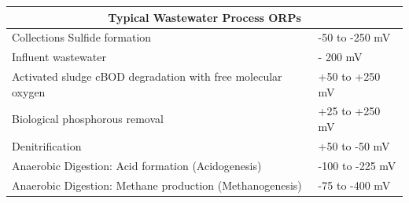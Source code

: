 			
			\setlength{\arrayrulewidth}{0.3mm}
			\setlength{\tabcolsep}{8 pt}
			\renewcommand{\arraystretch}{1.3}
			\begin{center}
				\begin{tabular}{ |p{9.5cm}|p{4.0cm}|}
					\hline
					\multicolumn{2}{|c|}{\textbf{Typical Wastewater Process ORPs}} \\
					\hline
					
					\hline
					\small Collections	Sulfide formation                                & \small -50 to -250 mV  \\
					\small Influent wastewater                                          & \small - 200 mV        \\
					\small Activated sludge	cBOD degradation with free molecular oxygen & \small +50 to +250 mV  \\
					\small Biological phosphorous removal                               & \small +25 to +250 mV  \\
					\small Denitrification                                              & \small +50 to -50 mV   \\
					\small Anaerobic Digestion: Acid formation (Acidogenesis)           & \small -100 to -225 mV \\
					\small Anaerobic Digestion: Methane production (Methanogenesis)     & \small -75 to -400 mV  \\
					\hline
				\end{tabular}
				
			\end{center}
			
